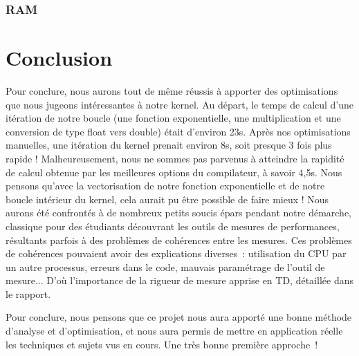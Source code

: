 \documentclass[12pt,a4paper]{article}
\begin{document}
\subsubsection{RAM}

\newpage
\section{Conclusion}

Pour conclure, nous aurons tout de même réussis à apporter des optimisations que
nous jugeons intéressantes à notre kernel. Au départ, le temps de calcul d'une
itération de notre boucle (une fonction exponentielle, une multiplication et une
conversion de type float vers double) était d'environ 23s. Après nos
optimisations manuelles, une itération du kernel prenait environ 8s, soit
presque 3 fois plus rapide ! Malheureusement, nous ne sommes pas parvenus à
atteindre la rapidité de calcul obtenue par les meilleures options du
compilateur, à savoir 4,5s. Nous pensons qu'avec la vectorisation de notre
fonction exponentielle et de notre boucle intérieur du kernel, cela aurait pu
être possible de faire mieux !
Nous aurons été confrontés à de nombreux petits soucis épars pendant notre
démarche, classique pour des étudiants découvrant les outils de mesures de
performances, résultants parfois à des problèmes de cohérences entre les
mesures. Ces problèmes de cohérences pouvaient avoir des explications diverses :
utilisation du CPU par un autre processus, erreurs dans le code, mauvais
paramétrage de l'outil de mesure... D'où l'importance de la rigueur de mesure
apprise en TD, détaillée dans le rapport.

Pour conclure, nous pensons que ce projet nous aura apporté une bonne méthode
d'analyse et d'optimisation, et nous aura permis de mettre en application réelle
les techniques et sujets vus en cours. Une très bonne première approche !
\end{document}
